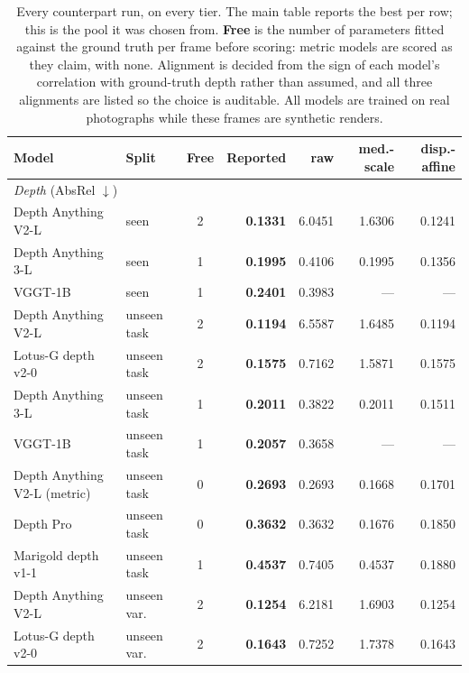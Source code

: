 \begin{table}[h]
\caption{Every counterpart run, on every tier. The main table reports the best per row; this is the pool it was chosen from. \textbf{Free} is the number of parameters fitted against the ground truth per frame before scoring: metric models are scored as they claim, with none. Alignment is decided from the sign of each model's correlation with ground-truth depth rather than assumed, and all three alignments are listed so the choice is auditable. All models are trained on real photographs while these frames are synthetic renders.}
\label{app:external}
\centering\small
\begin{tabular}{llcrrrr}
\toprule
Model & Split & Free & Reported & raw & med.-scale & disp.-affine \\
\midrule
\multicolumn{7}{l}{\emph{Depth} (AbsRel $\downarrow$)} \\
Depth Anything V2-L \citep{yang2024depthanythingv2} & seen & 2 & \textbf{0.1331} & 6.0451 & 1.6306 & 0.1241 \\
Depth Anything 3-L \citep{lin2025depthanything3} & seen & 1 & \textbf{0.1995} & 0.4106 & 0.1995 & 0.1356 \\
VGGT-1B \citep{wang2025vggt} & seen & 1 & \textbf{0.2401} & 0.3983 & --- & --- \\
Depth Anything V2-L \citep{yang2024depthanythingv2} & unseen task & 2 & \textbf{0.1194} & 6.5587 & 1.6485 & 0.1194 \\
Lotus-G depth v2-0 \citep{he2025lotus} & unseen task & 2 & \textbf{0.1575} & 0.7162 & 1.5871 & 0.1575 \\
Depth Anything 3-L \citep{lin2025depthanything3} & unseen task & 1 & \textbf{0.2011} & 0.3822 & 0.2011 & 0.1511 \\
VGGT-1B \citep{wang2025vggt} & unseen task & 1 & \textbf{0.2057} & 0.3658 & --- & --- \\
Depth Anything V2-L (metric) \citep{yang2024depthanythingv2} & unseen task & 0 & \textbf{0.2693} & 0.2693 & 0.1668 & 0.1701 \\
Depth Pro \citep{bochkovskii2024depthpro} & unseen task & 0 & \textbf{0.3632} & 0.3632 & 0.1676 & 0.1850 \\
Marigold depth v1-1 \citep{ke2024marigold} & unseen task & 1 & \textbf{0.4537} & 0.7405 & 0.4537 & 0.1880 \\
Depth Anything V2-L \citep{yang2024depthanythingv2} & unseen var. & 2 & \textbf{0.1254} & 6.2181 & 1.6903 & 0.1254 \\
Lotus-G depth v2-0 \citep{he2025lotus} & unseen var. & 2 & \textbf{0.1643} & 0.7252 & 1.7378 & 0.1643 \\

\end{tabular}
\end{table}
